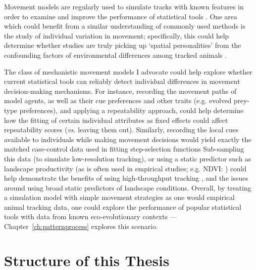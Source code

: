 Movement models are regularly used to simulate tracks with known features in order to examine and improve the performance of statistical tools \parencite[such as segmentation algorithms; see e.g.][]{gurarie2016,michelot2016,patin2020a}.
One area which could benefit from a similar understanding of commonly used methods is the study of individual variation in movement; specifically, this could help determine whether studies are truly picking up `spatial personalities' from the confounding factors of environmental differences among tracked animals \parencite{stuber2022,spiegel2022}.

The class of mechanistic movement models I advocate could help explore whether current statistical tools can reliably detect individual differences in movement decision-making mechanisms.
For instance, recording the movement paths of model agents, as well as their cue preferences and other traits (e.g. evolved prey-type preferences), and applying a repeatability approach, could help determine how the fitting of certain individual attributes as fixed effects could affect repeatability scores (\emph{vs.} leaving them out).
Similarly, recording the local cues available to individuals while making movement decisions would yield exactly the matched case-control data used in fitting step-selection functions \parencite[see][]{signer2019}
Sub-sampling this data (to simulate low-resolution tracking), or using a static predictor such as landscape productivity (as is often used in empirical studies; e.g. NDVI: \cite{pettorelli2011}) could help demonstrate the benefits of using high-throughput tracking \parencite{nathan2022}, and the issues around using broad static predictors of landscape conditions.
Overall, by treating a simulation model with simple movement strategies as one would empirical animal tracking data, one could explore the performance of popular statistical tools with data from known eco-evolutionary contexts --- Chapter~\ref{ch:patternprocess} explores this scenario.

\section*{Structure of this Thesis}

